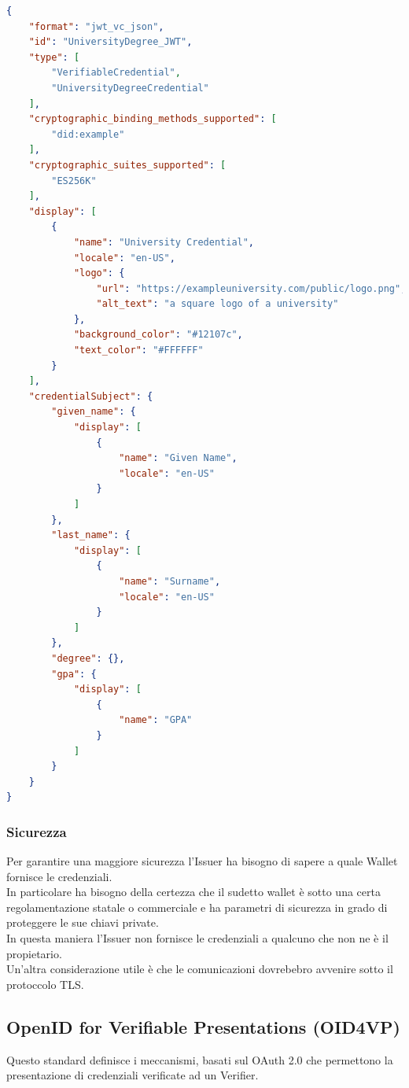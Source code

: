 \begin{lstlisting}[language=json,firstnumber=1]
{
    "format": "jwt_vc_json",
    "id": "UniversityDegree_JWT",
    "type": [
        "VerifiableCredential",
        "UniversityDegreeCredential"
    ],
    "cryptographic_binding_methods_supported": [
        "did:example"
    ],
    "cryptographic_suites_supported": [
        "ES256K"
    ],
    "display": [
        {
            "name": "University Credential",
            "locale": "en-US",
            "logo": {
                "url": "https://exampleuniversity.com/public/logo.png",
                "alt_text": "a square logo of a university"
            },
            "background_color": "#12107c",
            "text_color": "#FFFFFF"
        }
    ],
    "credentialSubject": {
        "given_name": {
            "display": [
                {
                    "name": "Given Name",
                    "locale": "en-US"
                }
            ]
        },
        "last_name": {
            "display": [
                {
                    "name": "Surname",
                    "locale": "en-US"
                }
            ]
        },
        "degree": {},
        "gpa": {
            "display": [
                {
                    "name": "GPA"
                }
            ]
        }
    }
}
\end{lstlisting}

\subsubsection{Sicurezza}
Per garantire una maggiore sicurezza l'Issuer ha bisogno di sapere a quale Wallet fornisce le credenziali.\\
In particolare ha bisogno della certezza che il sudetto wallet è sotto una certa regolamentazione statale o commerciale e ha parametri di sicurezza
in grado di proteggere le sue chiavi private.\\
In questa maniera l'Issuer non fornisce le credenziali a qualcuno che non ne è il propietario.\\
Un'altra considerazione utile è che le comunicazioni dovrebebro avvenire sotto il protoccolo TLS.

\subsection{OpenID for Verifiable Presentations (OID4VP)}
Questo standard definisce i meccanismi, basati sul OAuth 2.0 che permettono la presentazione di credenziali verificate ad un Verifier.\\

